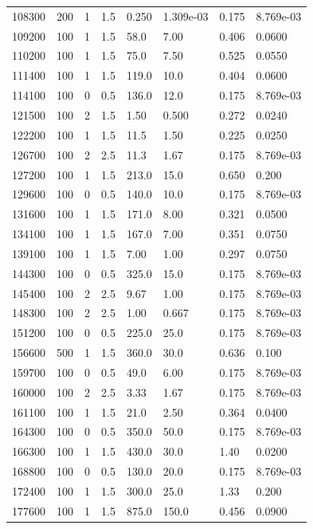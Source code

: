 \documentclass[preview]{standalone}
\begin{document}
{{{\begin{tabular}{L{1.2cm}C{1.2cm} C{0.3cm}C{0.5cm} C{1.4cm}C{1.4cm} C{1.4cm}C{1.4cm}}
  108300  &   200  & 1     & 1.5 &  0.250  & 1.309e-03  & 0.175 &  8.769e-03   \\ 
  109200  &   100  & 1     & 1.5 &  58.0  & 7.00  & 0.406 &  0.0600   \\ 
  110200  &   100  & 1     & 1.5 &  75.0  & 7.50  & 0.525 &  0.0550   \\ 
  111400  &   100  & 1     & 1.5 &  119.0  & 10.0  & 0.404 &  0.0600   \\ 
  114100  &   100  & 0     & 0.5 &  136.0  & 12.0  & 0.175 &  8.769e-03   \\ 
  121500  &   100  & 2     & 1.5 &  1.50  & 0.500  & 0.272 &  0.0240   \\ 
  122200  &   100  & 1     & 1.5 &  11.5  & 1.50  & 0.225 &  0.0250   \\ 
  126700  &   100  & 2     & 2.5 &  11.3  & 1.67  & 0.175 &  8.769e-03   \\ 
  127200  &   100  & 1     & 1.5 &  213.0  & 15.0  & 0.650 &  0.200   \\ 
  129600  &   100  & 0     & 0.5 &  140.0  & 10.0  & 0.175 &  8.769e-03   \\ 
  131600  &   100  & 1     & 1.5 &  171.0  & 8.00  & 0.321 &  0.0500   \\ 
  134100  &   100  & 1     & 1.5 &  167.0  & 7.00  & 0.351 &  0.0750   \\ 
  139100  &   100  & 1     & 1.5 &  7.00  & 1.00  & 0.297 &  0.0750   \\ 
  144300  &   100  & 0     & 0.5 &  325.0  & 15.0  & 0.175 &  8.769e-03   \\ 
  145400  &   100  & 2     & 2.5 &  9.67  & 1.00  & 0.175 &  8.769e-03   \\ 
  148300  &   100  & 2     & 2.5 &  1.00  & 0.667  & 0.175 &  8.769e-03   \\ 
  151200  &   100  & 0     & 0.5 &  225.0  & 25.0  & 0.175 &  8.769e-03   \\ 
  156600  &   500  & 1     & 1.5 &  360.0  & 30.0  & 0.636 &  0.100   \\ 
  159700  &   100  & 0     & 0.5 &  49.0  & 6.00  & 0.175 &  8.769e-03   \\ 
  160000  &   100  & 2     & 2.5 &  3.33  & 1.67  & 0.175 &  8.769e-03   \\ 
  161100  &   100  & 1     & 1.5 &  21.0  & 2.50  & 0.364 &  0.0400   \\ 
  164300  &   100  & 0     & 0.5 &  350.0  & 50.0  & 0.175 &  8.769e-03   \\ 
  166300  &   100  & 1     & 1.5 &  430.0  & 30.0  & 1.40 &  0.0200   \\ 
  168800  &   100  & 0     & 0.5 &  130.0  & 20.0  & 0.175 &  8.769e-03   \\ 
  172400  &   100  & 1     & 1.5 &  300.0  & 25.0  & 1.33 &  0.200   \\ 
  177600  &   100  & 1     & 1.5 &  875.0  & 150.0  & 0.456 &  0.0900   \\ 
\hline 
\end{tabular} 

}}}
\end{document}
